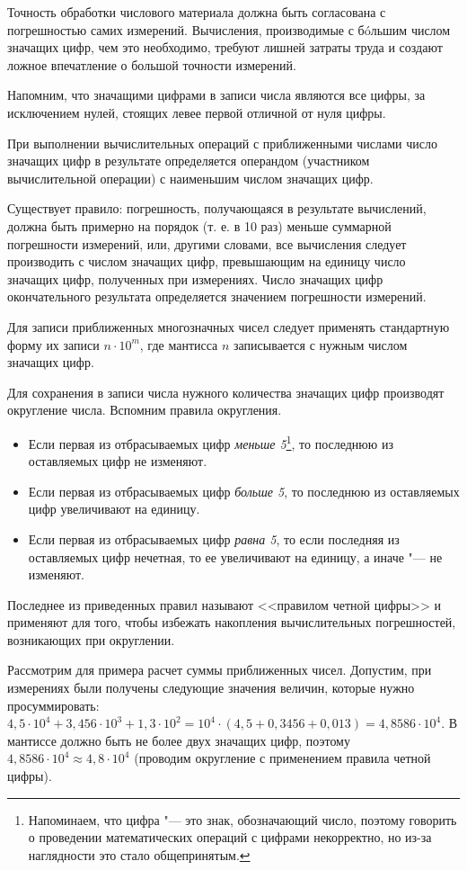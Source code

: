 \documentclass[a4paper, 12pt]{extarticle}
\begin{document}
Точность обработки числового материала должна быть согласована с погрешностью самих измерений. Вычисления, производимые с б\'oльшим числом значащих цифр, чем это необходимо, требуют лишней затраты труда и создают ложное впечатление о большой точности измерений.

Напомним, что значащими цифрами в записи числа являются все цифры, за исключением нулей, стоящих левее первой отличной от нуля цифры.

При выполнении вычислительных операций с приближенными числами число значащих цифр в результате определяется операндом (участником вычислительной операции) с наименьшим числом значащих цифр.

Существует правило: погрешность, получающаяся в результате вычислений, должна быть примерно на порядок (т. е. в 10 раз) меньше суммарной погрешности измерений, или, другими словами, все вычисления следует производить с числом значащих цифр, превышающим на единицу число значащих цифр, полученных при измерениях. Число значащих цифр окончательного результата определяется значением погрешности измерений.

Для записи приближенных многозначных чисел следует применять стандартную форму их записи $n \cdot 10^m$, где мантисса $n$ записывается с нужным числом значащих цифр.

Для сохранения в записи числа нужного количества значащих цифр производят округление числа. Вспомним правила округления.

\begin{itemize}
  \item Если первая из отбрасываемых цифр \emph{меньше 5}\footnote{Напоминаем, что цифра "--- это знак, обозначающий число, поэтому говорить о проведении математических операций с цифрами некорректно, но из-за наглядности это стало общепринятым. }, то последнюю из оставляемых цифр не изменяют.
  \item Если первая из отбрасываемых цифр \emph{больше 5}, то последнюю из оставляемых цифр увеличивают на единицу.
  \item Если первая из отбрасываемых цифр \emph{равна 5}, то если последняя из оставляемых цифр нечетная, то ее увеличивают на единицу, а иначе "--- не изменяют.
\end{itemize}
Последнее из приведенных правил называют <<правилом четной цифры>> и применяют для того, чтобы избежать накопления вычислительных погрешностей, возникающих при округлении.

Рассмотрим для примера расчет суммы приближенных чисел. Допустим, при измерениях были получены следующие значения величин, которые нужно просуммировать: $4,5 \cdot 10^4 + 3,456 \cdot 10^3 + 1,3 \cdot 10^2 = 10^4 \cdot (4,5 + 0,3456 + 0,013) = 4,8586 \cdot 10^4$. В мантиссе должно быть не более двух значащих цифр, поэтому $4,8586 \cdot 10^4 \approx 4,8 \cdot 10^4$ (проводим округление с применением правила четной цифры).
\end{document}
